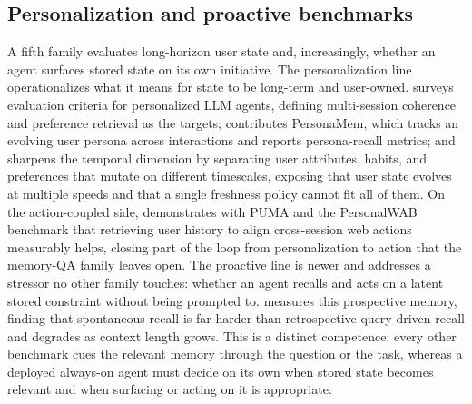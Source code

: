 \subsection{Personalization and proactive benchmarks}

A fifth family evaluates long-horizon user state and, increasingly, whether an agent surfaces stored state on its own initiative. The personalization line operationalizes what it means for state to be long-term and user-owned. \citet{xu2026personalizedllmpoweredagentsfoundations} surveys evaluation criteria for personalized LLM agents, defining multi-session coherence and preference retrieval as the targets; \citet{jiang2025personamem} contributes PersonaMem, which tracks an evolving user persona across interactions and reports persona-recall metrics; and \citet{xie2026dynamicmem} sharpens the temporal dimension by separating user attributes, habits, and preferences that mutate on different timescales, exposing that user state evolves at multiple speeds and that a single freshness policy cannot fit all of them. On the action-coupled side, \citet{cai2025personalizedwebagents} demonstrates with PUMA and the PersonalWAB benchmark that retrieving user history to align cross-session web actions measurably helps, closing part of the loop from personalization to action that the memory-QA family leaves open. The proactive line is newer and addresses a stressor no other family touches: whether an agent recalls and acts on a latent stored constraint without being prompted to. \citet{zhang2026triggerbench} measures this prospective memory, finding that spontaneous recall is far harder than retrospective query-driven recall and degrades as context length grows. This is a distinct competence: every other benchmark cues the relevant memory through the question or the task, whereas a deployed always-on agent must decide on its own when stored state becomes relevant and when surfacing or acting on it is appropriate.

